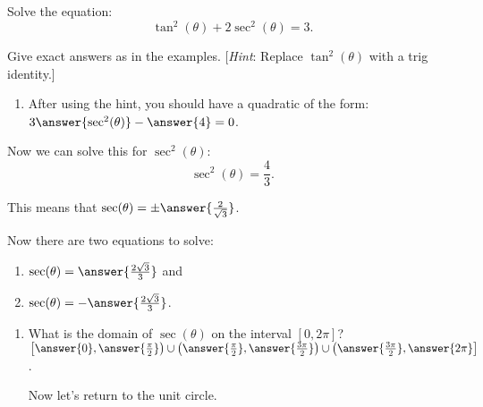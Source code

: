 \documentclass{ximera}
\author{Elizabeth Campolongo}
\begin{document}
\begin{exercise}
Solve the equation:
$$\tan^2(\theta) + 2\sec^2(\theta)=3.$$

Give exact answers as in the examples. [\textit{Hint}: Replace $\tan^2(\theta)$ with a trig identity.]

\begin{enumerate}
\item After using the hint, you should have a quadratic of the form: \smallskip\\

 $3\answer{\sec^2(\theta)} -\answer{4} = 0$.
 \end{enumerate}
\begin{exercise}
Now we can solve this for $\sec^2(\theta)$:
$$
\sec^2(\theta) = \frac{4}{3}. 
$$

This means that $\sec(\theta) = \pm\answer{\frac{2}{\sqrt{3}}}$.

\begin{exercise}
Now there are two equations to solve:
\begin{enumerate}
\item $\sec(\theta) = \answer{\frac{2\sqrt{3}}{3}}$ and

\item $\sec(\theta) = -\answer{\frac{2\sqrt{3}}{3}}$.
\end{enumerate}

\begin{exercise}
\begin{enumerate}
\item What is the domain of $\sec(\theta)$ on the interval $[0, 2\pi]$?\smallskip \\
$\left[\answer{0},\answer{\frac{\pi}{2}}\right) \cup \left(\answer{\frac{\pi}{2}}, \answer{\frac{3\pi}{2}}\right) \cup \left(\answer{\frac{3\pi}{2}},\answer{2\pi}\right]$.


\bigskip
Now let's return to the unit circle. 
\begin{image}
\end{image}
\end{enumerate}
\end{exercise}
\end{exercise}
\end{exercise}
\end{exercise}
\end{document}
